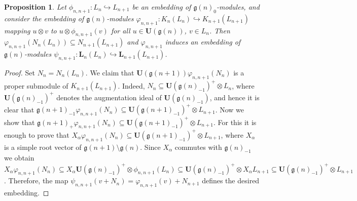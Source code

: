 \documentclass[12pt]{amsart}
\newcommand\g{\mathfrak{g}}
\newcommand\bU{\mathbf{U}}
\newcommand\bL{\mathbf{L}}
\theoremstyle{plain}
\newtheorem{prop}[theo]{Proposition}
\theoremstyle{definition}
\numberwithin{equation}{section}
\begin{document}
\begin{prop}\label{prop:g_0-emb.g-emb}
Let $\phi_{n,n+1} : L_n\hookrightarrow L_{n+1}$ be an embedding of $\g(n)_0$-modules, and consider the embedding of $\g(n)$-modules $\varphi_{n,n+1}:K_n(L_n)\hookrightarrow K_{n+1}(L_{n+1})$ mapping $u\otimes v$ to $u\otimes \phi_{n,n+1}(v)$ for all $u\in \bU(\g(n))$, $v\in L_{n}$. Then $\varphi_{n,n+1}(N_{n}(L_n))\subseteq N_{n+1}(L_{n+1})$ and $\varphi_{n,n+1}$ induces an embedding of $\g(n)$-modules $\psi_{n,n+1}:\bL_n(L_n)\hookrightarrow \bL_{n+1}(L_{n+1})$.
\end{prop}
\begin{proof}
Set $N_n = N_n(L_n)$. We claim that $\bU(\g(n+1))\varphi_{n,n+1}(N_n)$ is a proper submodule of $K_{n+1}(L_{n+1})$. Indeed, $N_n\subseteq \bU(\g(n)_{-1})^+\otimes L_n$, where $\bU(\g(n)_{-1})^+$ denotes the augmentation ideal of $\bU(\g(n)_{-1})$, and hence it is clear that $\g(n+1)_{-1}\varphi_{n,n+1}(N_n)\subseteq \bU(\g(n+1)_{-1})^+\otimes L_{n+1}$. Now we show that $\g(n+1)_+\varphi_{n,n+1}(N_n)\subseteq \bU(\g(n+1)_{-1})^+\otimes L_{n+1}$. For this it is enough to prove that $X_\alpha \varphi_{n,n+1}(N_n)\subseteq \bU(\g(n+1)_{-1})^+\otimes L_{n+1}$, where $X_\alpha$ is a simple root vector of $\g(n+1)\setminus \g(n)$. Since $X_\alpha$ commutes with $\g(n)_{-1}$ we obtain  $X_\alpha \varphi_{n,n+1}(N_n) \subseteq X_\alpha \bU(\g(n)_{-1})^+\otimes \phi_{n,n+1}(L_n) \subseteq \bU(\g(n)_{-1})^+\otimes X_\alpha L_{n+1} \subseteq \bU(\g(n)_{-1})^+\otimes L_{n+1}$. Therefore, the map $\psi_{n,n+1}(v + N_n) = \varphi_{n,n+1}(v)+N_{n+1}$ defines the desired embedding.
\end{proof}
\end{document}

